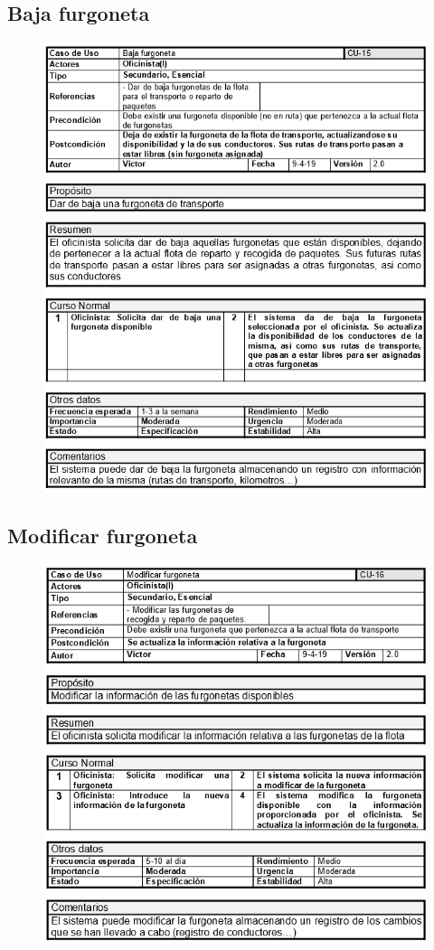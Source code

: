 \subsection{Baja furgoneta}
\begin{figure}[H]
	\centering
	\includegraphics[width=16cm]{15}
\end{figure}
\subsection{Modificar furgoneta}
\begin{figure}[H]
	\centering
	\includegraphics[width=16cm]{16}
\end{figure}
